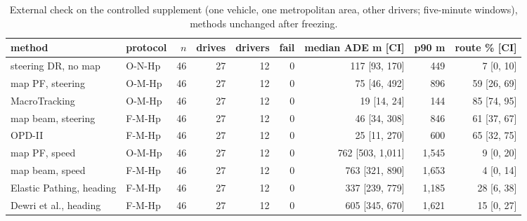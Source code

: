\begin{table}[t]\centering\scriptsize\setlength{\tabcolsep}{3pt}
\caption{External check on the controlled supplement (one vehicle, one metropolitan area, other drivers; five-minute windows), methods unchanged after freezing.}\label{tab:supp_controlled}
\begin{tabular}{llrrrrrrr}\toprule
method & protocol & $n$ & drives & drivers & fail & median ADE m [CI] & p90 m & route \% [CI] \\\midrule
steering DR, no map & O-N-Hp & 46 & 27 & 12 & 0 & 117 [93, 170] & 449 & 7 [0, 10] \\
map PF, steering & O-M-Hp & 46 & 27 & 12 & 0 & 75 [46, 492] & 896 & 59 [26, 69] \\
MacroTracking & O-M-Hp & 46 & 27 & 12 & 0 & 19 [14, 24] & 144 & 85 [74, 95] \\
map beam, steering & F-M-Hp & 46 & 27 & 12 & 0 & 46 [34, 308] & 846 & 61 [37, 67] \\
OPD-II & F-M-Hp & 46 & 27 & 12 & 0 & 25 [11, 270] & 600 & 65 [32, 75] \\
map PF, speed & O-M-Hp & 46 & 27 & 12 & 0 & 762 [503, 1{,}011] & 1{,}545 & 9 [0, 20] \\
map beam, speed & F-M-Hp & 46 & 27 & 12 & 0 & 763 [321, 890] & 1{,}653 & 4 [0, 14] \\
Elastic Pathing, heading & F-M-Hp & 46 & 27 & 12 & 0 & 337 [239, 779] & 1{,}185 & 28 [6, 38] \\
Dewri et al., heading & F-M-Hp & 46 & 27 & 12 & 0 & 605 [345, 670] & 1{,}621 & 15 [0, 27] \\
\bottomrule\end{tabular}
\end{table}
